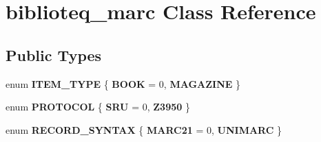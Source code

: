 \hypertarget{classbiblioteq__marc}{}\section{biblioteq\+\_\+marc Class Reference}
\label{classbiblioteq__marc}
\subsection*{Public Types}
\begin{DoxyCompactItemize}
\item 
enum {\bfseries I\+T\+E\+M\+\_\+\+T\+Y\+PE} \{ {\bfseries B\+O\+OK} = 0, 
{\bfseries M\+A\+G\+A\+Z\+I\+NE}
 \}\hypertarget{classbiblioteq__marc_aef55c45eeca365be310533f0c318c877}{}\label{classbiblioteq__marc_aef55c45eeca365be310533f0c318c877}

\item 
enum {\bfseries P\+R\+O\+T\+O\+C\+OL} \{ {\bfseries S\+RU} = 0, 
{\bfseries Z3950}
 \}\hypertarget{classbiblioteq__marc_ae2e5c435b3e42f74d9a58ce2a17907ef}{}\label{classbiblioteq__marc_ae2e5c435b3e42f74d9a58ce2a17907ef}

\item 
enum {\bfseries R\+E\+C\+O\+R\+D\+\_\+\+S\+Y\+N\+T\+AX} \{ {\bfseries M\+A\+R\+C21} = 0, 
{\bfseries U\+N\+I\+M\+A\+RC}
 \}\hypertarget{classbiblioteq__marc_af1bcc8df3efe413864deb128541b8264}{}\label{classbiblioteq__marc_af1bcc8df3efe413864deb128541b8264}

\end{DoxyCompactItemize}
